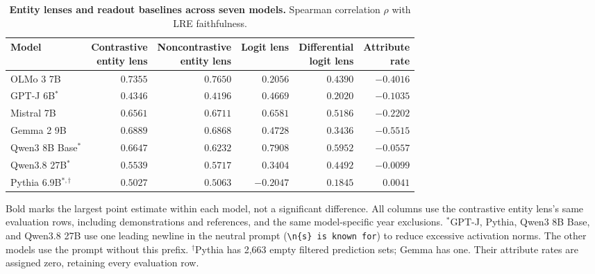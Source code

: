 \begin{table}[!htbp]
\centering
\caption{\textbf{Entity lenses and readout baselines across seven models.} Spearman correlation $\rho$ with LRE faithfulness.}
\label{tab:shared-lenses-spearman}
\begingroup
\small
\renewcommand{\arraystretch}{1.18}
\setlength{\tabcolsep}{3pt}
\begin{tabular*}{\linewidth}{@{\extracolsep{\fill}}lrrrrr@{}}
\toprule
Model & \shortstack[r]{Contrastive\\entity lens} & \shortstack[r]{Noncontrastive\\entity lens} & Logit lens & \shortstack[r]{Differential\\logit lens} & \shortstack[r]{Attribute\\rate} \\
\midrule
OLMo 3 7B & $\phantom{-}0.7355$ & $\phantom{-}\mathbf{0.7650}$ & $\phantom{-}0.2056$ & $\phantom{-}0.4390$ & $-0.4016$ \\
GPT-J 6B$^{*}$ & $\phantom{-}0.4346$ & $\phantom{-}0.4196$ & $\phantom{-}\mathbf{0.4669}$ & $\phantom{-}0.2020$ & $-0.1035$ \\
Mistral 7B & $\phantom{-}0.6561$ & $\phantom{-}\mathbf{0.6711}$ & $\phantom{-}0.6581$ & $\phantom{-}0.5186$ & $-0.2202$ \\
Gemma 2 9B & $\phantom{-}\mathbf{0.6889}$ & $\phantom{-}0.6868$ & $\phantom{-}0.4728$ & $\phantom{-}0.3436$ & $-0.5515$ \\
Qwen3 8B Base$^{*}$ & $\phantom{-}0.6647$ & $\phantom{-}0.6232$ & $\phantom{-}\mathbf{0.7908}$ & $\phantom{-}0.5952$ & $-0.0557$ \\
Qwen3.8 27B$^{*}$ & $\phantom{-}0.5539$ & $\phantom{-}\mathbf{0.5717}$ & $\phantom{-}0.3404$ & $\phantom{-}0.4492$ & $-0.0099$ \\
Pythia 6.9B$^{*,\dagger}$ & $\phantom{-}0.5027$ & $\phantom{-}\mathbf{0.5063}$ & $-0.2047$ & $\phantom{-}0.1845$ & $\phantom{-}0.0041$ \\
\bottomrule
\end{tabular*}
\endgroup
\par\vspace{5pt}
\begin{minipage}{\linewidth}\footnotesize
Bold marks the largest point estimate within each model, not a significant difference. All columns use the contrastive entity lens's same evaluation rows, including demonstrations and references, and the same model-specific year exclusions. $^{*}$GPT-J, Pythia, Qwen3 8B Base, and Qwen3.8 27B use one leading newline in the neutral prompt (\texttt{\textbackslash n\{s\} is known for}) to reduce excessive activation norms. The other models use the prompt without this prefix. $^{\dagger}$Pythia has 2,663 empty filtered prediction sets; Gemma has one. Their attribute rates are assigned zero, retaining every evaluation row.
\end{minipage}
\end{table}
